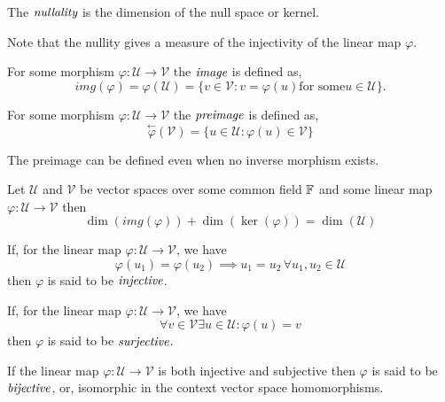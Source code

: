 \begin{defn}[Nullity]
	The $\emph{nullality}$ is the dimension of the null space or kernel.
\end{defn}

\begin{rem}
	Note that the nullity gives a measure of the injectivity of the linear map
	$\varphi$.
\end{rem}

\begin{defn}[Image]
	For some morphism $\varphi : \mathcal{U} \to \mathcal{V}$ the $\emph{image}$ is defined as,
	\[
		img(\varphi) =
		\varphi(\mathcal{U}) = \{ v \in \mathcal{V} : v = \varphi(u) \text{for some} u \in \mathcal{U} \}.
	\]
\end{defn}

\begin{defn}[Preimage]
	For some morphism $\varphi : \mathcal{U} \to \mathcal{V}$ the $\emph{preimage}$ is defined as,
	\[
		\stackrel{\leftarrow}{\varphi}(\mathcal{V}) = \{ u \in \mathcal{U} : \varphi(u) \in \mathcal{V} \}
	\]
\end{defn}

\begin{rem}
	The preimage can be defined even when no inverse morphism exists.
\end{rem}

\begin{thm}
	Let $\mathcal{U}$ and $\mathcal{V}$ be vector spaces over some common field $\mathbb{F}$
	and some linear map $\varphi : \mathcal{U} \to \mathcal{V}$ then
	\[
		\dim( img(\varphi) ) + \dim( \ker(\varphi) ) = \dim( \mathcal{U} )
	\]
\end{thm}

\begin{defn}[Injective]
	If, for the linear map $\varphi : \mathcal{U} \to \mathcal{V}$, we have
	\[
		\varphi(u_1) = \varphi(u_2) \implies u_1 = u_2 \, \forall u_1,u_2 \in \mathcal{U}
	\]
	then $\varphi$ is said to be $\emph{injective}$.
\end{defn}

\begin{defn}[Surjective]
	If, for the linear map $\varphi : \mathcal{U} \to \mathcal{V}$, we have
	\[
		\forall v \in \mathcal{V} \exists u \in \mathcal{U} : \varphi(u) = v
	\]
	then $\varphi$ is said to be $\emph{surjective}$.
\end{defn}

\begin{defn}[Bijective]
	If the linear map $\varphi : \mathcal{U} \to \mathcal{V}$ is both
	injective and subjective then $\varphi$ is said to be $\emph{bijective}$, or,
	isomorphic in the context vector space homomorphisms.
\end{defn}

